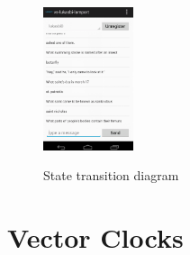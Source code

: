 \documentclass{report}
\newcommand{\lfig}[1]{\label{fig:#1}}
\begin{document}
\begin{figure}
    \centering
    \includegraphics[height=4.2cm]{std.png}
    \lfig{std}   
    \caption{State transition diagram}
\end{figure}

\section{Vector Clocks}
\end{document}
